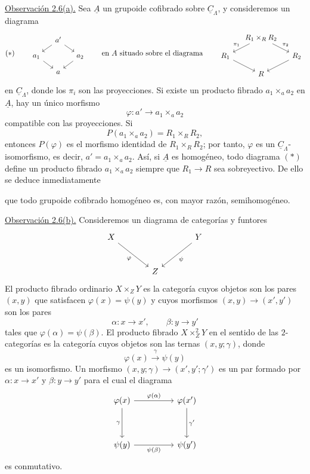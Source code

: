 \underline{Observación 2.6(a).} Sea $\underline A$ un grupoide
cofibrado sobre $\underline C_\Lambda$, y consideremos un diagrama
\[
(*)\qquad
\begin{tikzcd}[row sep=small,column sep=small]
 & a' \arrow[dl] \arrow[dr] & \\
 a_1 \arrow[dr] & & a_2 \arrow[dl]\\
 & a &
\end{tikzcd}
\qquad\text{en $\underline A$ situado sobre el diagrama}\qquad
\begin{tikzcd}[row sep=small,column sep=small]
 & R_1\times_R R_2 \arrow[dl,"{\pi_1}"'] \arrow[dr,"{\pi_2}"] & \\
 R_1 \arrow[dr] & & R_2 \arrow[dl]\\
 & R &
\end{tikzcd}
\]
en $\underline C_\Lambda$, donde los $\pi_i$ son las proyecciones.
Si existe un producto fibrado $a_1\times_a a_2$ en $\underline A$,
hay un único morfismo
\[
 \varphi:a'\longrightarrow a_1\times_a a_2
\]
compatible con las proyecciones. Si
\[
 P(a_1\times_a a_2)=R_1\times_R R_2,
\]
entonces $P(\varphi)$ es el morfismo identidad de $R_1\times_R R_2$;
por tanto, $\varphi$ es un $\underline C_\Lambda$-isomorfismo, es
decir, $a'=a_1\times_a a_2$. Así, si $\underline A$ es homogéneo,
todo diagrama $(*)$ define un producto fibrado $a_1\times_a a_2$
siempre que $R_1\longrightarrow R$ sea sobreyectivo. De ello se deduce
inmediatamente


que todo grupoide cofibrado homogéneo es, con mayor razón,
semihomogéneo.

\underline{Observación 2.6(b).} Consideremos un diagrama de categorías
y funtores
\[
\begin{tikzcd}[row sep=large,column sep=large]
 X \arrow[dr,"{\varphi}"'] & & Y \arrow[dl,"{\psi}"]\\
 & Z &
\end{tikzcd}
\]
El producto fibrado ordinario $X\times_ZY$ es la categoría cuyos
objetos son los pares $(x,y)$ que satisfacen
$\varphi(x)=\psi(y)$ y cuyos morfismos
$(x,y)\longrightarrow(x',y')$ son los pares
\[
 \alpha:x\longrightarrow x',\qquad
 \beta:y\longrightarrow y'
\]
tales que $\varphi(\alpha)=\psi(\beta)$. El producto fibrado
$X\times_Z^2Y$ en el sentido de las $2$-categorías es la categoría
cuyos objetos son las ternas $(x,y;\gamma)$, donde
\[
 \varphi(x)\xrightarrow{\ \gamma\ }\psi(y)
\]
es un isomorfismo. Un morfismo
$(x,y;\gamma)\longrightarrow(x',y';\gamma')$ es un par formado por
$\alpha:x\longrightarrow x'$ y $\beta:y\longrightarrow y'$ para el
cual el diagrama
\[
\begin{tikzcd}[row sep=huge,column sep=huge]
 \varphi(x) \arrow[r,"{\varphi(\alpha)}"] \arrow[d,"{\gamma}"']
 & \varphi(x') \arrow[d,"{\gamma'}"]\\
 \psi(y) \arrow[r,"{\psi(\beta)}"'] & \psi(y')
\end{tikzcd}
\]
es conmutativo.

